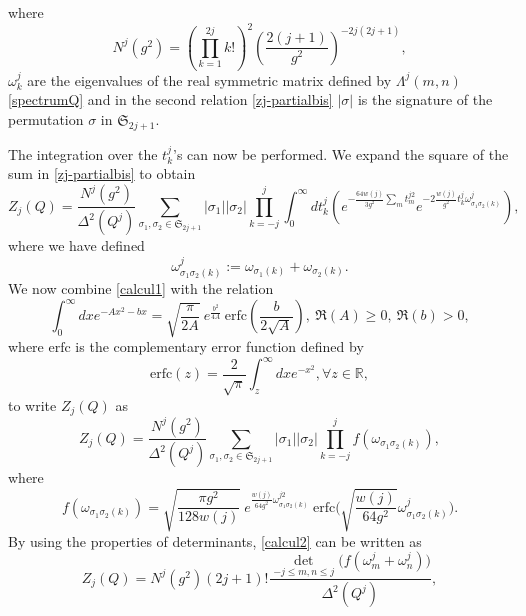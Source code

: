 \documentclass[a4paper,11pt,twoside]{article}
\numberwithin{equation}{section}
\theoremstyle{nonumberplain}
\newcounter{and}
\begin{document}
%
where%
%
\begin{equation}
N^j(g^2)=(\prod_{k=1}^{2j}k!)^2(\frac{2(j+1)}{g^2})^{-2j(2j+1)}\label{normal-zj},
\end{equation}
%
$\omega^j_k$ are the eigenvalues of the real symmetric matrix defined by $\Lambda^j(m,n)$ \eqref{spectrumQ} and in the second relation \eqref{zj-partialbis} $\vert\sigma\vert$ is the signature of the permutation $\sigma$ in $\mathfrak{S}_{2j+1}$.\par%
%
The integration over the $t^j_k$'s can now be performed. We expand the square of the sum in \eqref{zj-partialbis} to obtain%
%
\begin{equation}
Z_j(Q)=\frac{N^j(g^2)}{\Delta^2(Q^j)}\sum_{\sigma_1,\sigma_2\in\mathfrak{S}_{2j+1}}\vert\sigma_1\vert\vert\sigma_2\vert\prod_{k=-j}^j\int_0^\infty dt^j_k(e^{-\frac{64w(j)}{3g^2}\sum_{m}t^{j2}_m}e^{-2\frac{w(j)}{g^2}t^j_k\omega^j_{\sigma_1\sigma_2(k)}})\label{calcul1},
\end{equation}
%
where we have defined%
%
\begin{equation}
\omega^j_{\sigma_1\sigma_2(k)}:=\omega_{\sigma_1(k)}+\omega_{\sigma_2(k)}. 
\end{equation}
%
We now combine \eqref{calcul1} with the relation%
%
\begin{equation}
\int_0^\infty dxe^{-Ax^2-bx}={\sqrt{\frac{\pi}{2A}}}\ e^{\frac{b^2}{4A}}\ {\text{erfc}}(\frac{b}{2{\sqrt{ A}}}),\ \Re(A)\ge0,\ \Re(b)>0\label{erfc-integ},
\end{equation}
%
where ${\text{erfc}}$ is the complementary error function defined by%
%
\begin{equation}
\text{erfc}(z)=\frac{2}{{\sqrt{\pi}}}\int_z^\infty dxe^{-x^2}, \forall z\in\mathbb{R},
\end{equation}
%
to write $Z_j(Q)$ as%
%
\begin{equation}
Z_j(Q)=\frac{N^j(g^2)}{\Delta^2(Q^j)}\sum_{\sigma_1,\sigma_2\in\mathfrak{S}_{2j+1}}\vert\sigma_1\vert\vert\sigma_2\vert\prod_{k=-j}^j f(\omega_{\sigma_1\sigma_2(k)})\label{calcul2},
\end{equation}
where%
\begin{equation}
f(\omega_{\sigma_1\sigma_2(k)})={\sqrt{\frac{\pi g^2}{128w(j)} }}\ e^{\frac{w(j)}{64g^2}\omega^{j2}_{\sigma_1\sigma_2(k)}}\ \text{erfc}\big({\sqrt{\frac{w(j)}{64g^2} }}\omega^j_{\sigma_1\sigma_2(k)} \big)\label{functionspect}.
\end{equation}
%
By using the properties of determinants, \eqref{calcul2} can be written as%
%
\begin{equation}
Z_j(Q)=N^j(g^2)(2j+1)!\frac{\det_{-j\le m,n\le j}\big(f(\omega^j_m+\omega^j_n)\big)}{\Delta^2(Q^j)}\label{partitionfactor},
\end{equation}
\end{document}
